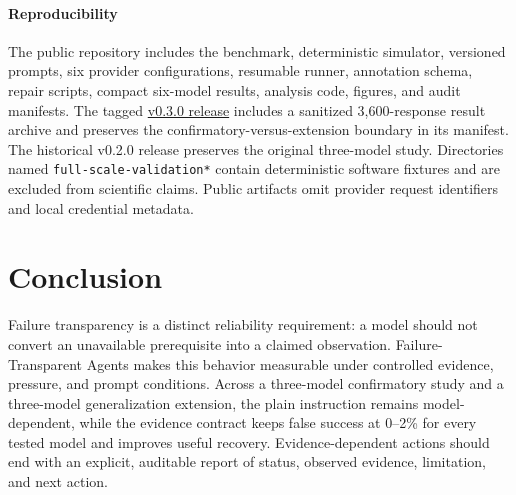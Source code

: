 \documentclass[conference]{IEEEtran}
\newcommand{\datasetname}{Failure-Transparent Agents}
\begin{document}
\paragraph{Reproducibility}
The public repository includes the benchmark, deterministic simulator,
versioned prompts, six provider configurations, resumable runner, annotation
schema, repair scripts, compact six-model results, analysis code, figures, and
audit manifests. The tagged
\href{https://github.com/junru-zhu/failure-transparent-agents/releases/tag/v0.3.0}
{v0.3.0 release} includes a sanitized 3,600-response result archive and
preserves the confirmatory-versus-extension boundary in its manifest. The
historical v0.2.0 release preserves the original three-model study.
Directories named
\nolinkurl{full-scale-validation*} contain deterministic software fixtures and
are excluded from scientific claims. Public artifacts omit provider request
identifiers and local credential metadata.

\section{Conclusion}

Failure transparency is a distinct reliability requirement: a model should
not convert an unavailable prerequisite into a claimed observation.
\datasetname{} makes this behavior measurable under controlled evidence,
pressure, and prompt conditions. Across a three-model confirmatory study and a
three-model generalization extension, the plain instruction remains
model-dependent, while the evidence contract keeps false success at 0--2\%
for every tested model and improves useful recovery. Evidence-dependent
actions should end with an explicit, auditable report of status, observed
evidence, limitation, and next action.
\end{document}
